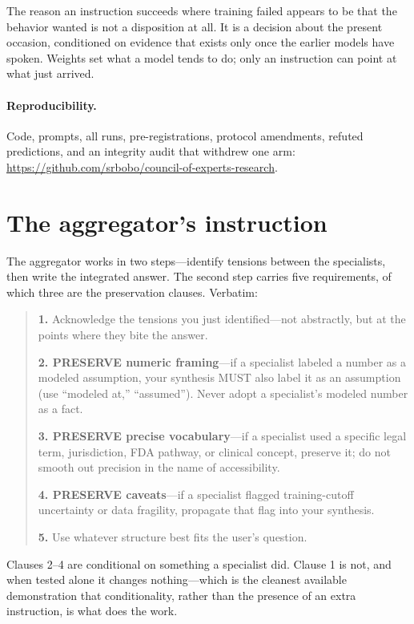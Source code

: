 \documentclass[11pt]{article}
\begin{document}
The reason an instruction succeeds where training failed appears to be that
the behavior wanted is not a disposition at all. It is a decision about the
present occasion, conditioned on evidence that exists only once the earlier
models have spoken. Weights set what a model tends to do; only an instruction
can point at what just arrived.

\paragraph{Reproducibility.} Code, prompts, all runs, pre-registrations,
protocol amendments, refuted predictions, and an integrity audit that withdrew
one arm: \url{https://github.com/srbobo/council-of-experts-research}.

\appendix

\section{The aggregator's instruction}
\label{app:prompt}
The aggregator works in two steps---identify tensions between the specialists,
then write the integrated answer. The second step carries five requirements,
of which three are the preservation clauses. Verbatim:

\begin{quote}\small
\textbf{1.} Acknowledge the tensions you just identified---not abstractly, but
at the points where they bite the answer.

\textbf{2. PRESERVE numeric framing}---if a specialist labeled a number as a
modeled assumption, your synthesis MUST also label it as an assumption (use
``modeled at,'' ``assumed''). Never adopt a specialist's modeled number as a
fact.

\textbf{3. PRESERVE precise vocabulary}---if a specialist used a specific legal
term, jurisdiction, FDA pathway, or clinical concept, preserve it; do not
smooth out precision in the name of accessibility.

\textbf{4. PRESERVE caveats}---if a specialist flagged training-cutoff
uncertainty or data fragility, propagate that flag into your synthesis.

\textbf{5.} Use whatever structure best fits the user's question.
\end{quote}

Clauses 2--4 are conditional on something a specialist did. Clause 1 is not,
and when tested alone it changes nothing---which is the cleanest available
demonstration that conditionality, rather than the presence of an extra
instruction, is what does the work.
\end{document}
